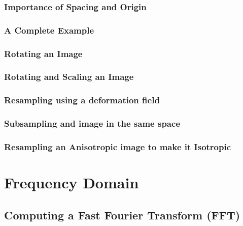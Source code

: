 \subsubsection{Importance of Spacing and Origin}



\subsubsection{A Complete Example}



\subsubsection{Rotating an Image}



\subsubsection{Rotating and Scaling an Image}


\subsubsection{Resampling using a deformation field}



\subsubsection{Subsampling and image in the same space}
\label{SubsampleVolume}



\subsubsection{Resampling an Anisotropic image to make it Isotropic}
\label{ResampleVolumesToBeIsotropic}



\section{Frequency Domain}
\label{sec:FrequencyDomain}


\subsection{Computing a Fast Fourier Transform (FFT)}
\label{FFTImageFilter}



